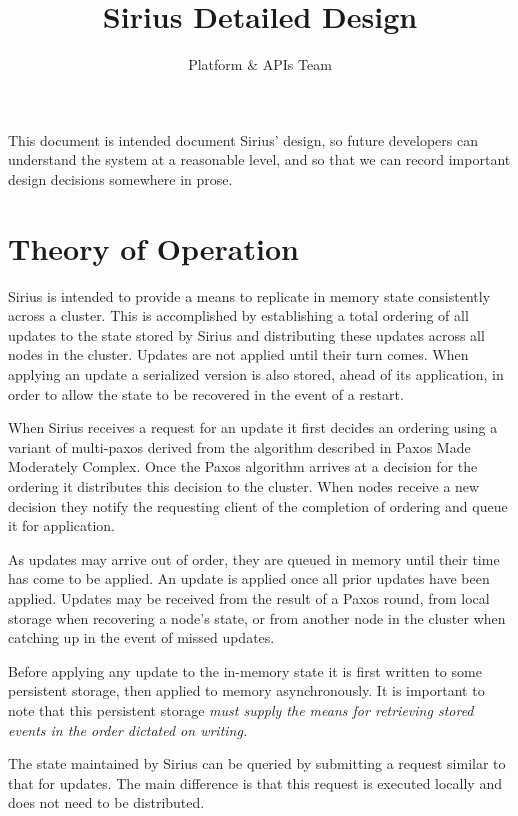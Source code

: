 \documentclass[11pt]{article}
\begin{document}
\title{Sirius Detailed Design}
\author{Platform \& APIs Team}
\maketitle

This document is intended document Sirius’ design, so future developers can understand the system at a reasonable level, and so that we can record important design decisions somewhere in prose.  

\section{Theory of Operation}
Sirius is intended to provide a means to replicate in memory state consistently
across a cluster. This is accomplished by establishing a total ordering of all
updates to the state stored by Sirius and distributing these updates across all
nodes in the cluster. Updates are not applied until their turn comes. When
applying an update a serialized version is also stored, ahead of its
application, in order to allow the state to be recovered in the event of a
restart.

When Sirius receives a request for an update it first decides an ordering using
a variant of multi-paxos derived from the algorithm described in Paxos Made     %
Moderately Complex. Once the Paxos algorithm arrives at a decision for the
ordering it distributes this decision to the cluster.  When nodes receive a new
decision they notify the requesting client of the completion of ordering and
queue it for application.

As updates may arrive out of order, they are queued in memory until their time
has come to be applied.  An update is applied once all prior updates have been applied.
Updates may be received from the result of a Paxos round, from local storage
when recovering a node's state, or from another node in the cluster when
catching up in the event of missed updates.

Before applying any update to the in-memory state it is first written to some
persistent storage, then applied to memory asynchronously. It is important to
note that this persistent storage \em{must} supply the means for retrieving
stored events in the order dictated on writing.

The state maintained by Sirius can be queried by submitting a request similar
to that for updates.  The main difference is that this request is executed
locally and does not need to be distributed.
\end{document}
